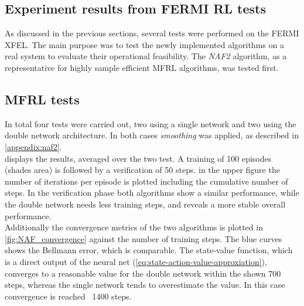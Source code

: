 \documentclass[
 reprint,
 amsmath,amssymb,amsfonts,clevref,
 aps,
prstab,
]{revtex4-2}
\begin{document}
\subsection{Experiment results from FERMI RL tests}
As discussed in the previous sections, several tests were performed on the FERMI XFEL.
The main purpose was to test the newly implemented algorithms on a real system to evaluate their operational feasibility. The \emph{NAF2} algorithm, as a representative for highly sample efficient MFRL algorithms, was tested first.
\subsection{MFRL tests}
In total four tests were carried out, two using a single network and two using the double network architecture. In both cases \emph{smoothing} was applied, as described in \cref{appendix:naf2}.\\
 displays the results, averaged over the two test. A training of 100 episodes (shades area) is followed by a verification of 50 steps. in the upper figure the number of iterations per episode is plotted including the cumulative number of steps.
In the verification phase both algorithms show a similar performance, while the double network needs less training steps, and reveals a more stable overall performance.\\
Additionally the convergence metrics of the two algorithms is plotted in \cref{fig:NAF_convergence} against the number of training steps. The blue curves shows the Bellmann error, which is comparable. The state-value function, which is a direct output of the neural net (\cref{eq:state-action-value-approxiation}), converges to a reasonable value for the double network within the shown 700 steps, whereas the single network tends to overestimate the value. In this case convergence is reached ~1400 steps.\\
\end{document}
